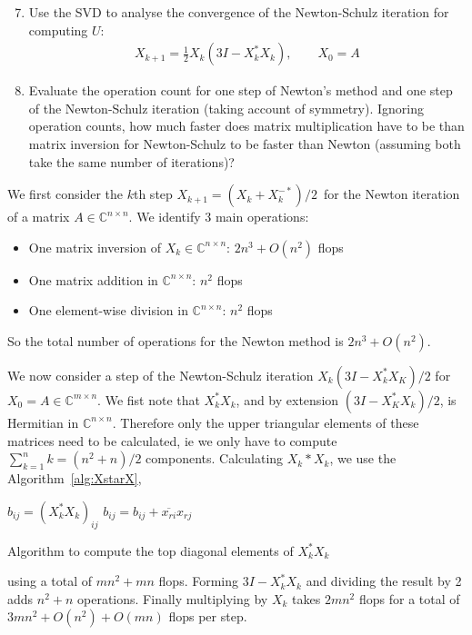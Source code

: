 \documentclass[10pt, A4paper]{article}
\begin{document}
\vspace{0.2cm}
\begin{enumerate}
	\setcounter{enumi}{6}
	\item Use the SVD to analyse the convergence of the
	Newton\nobreakdash-Schulz iteration for computing $U$:
	\begin{align*}
		X_{k+1} = \frac{1}{2}X_k(3I - X_k^* X_k), \qquad X_0 = A
	\end{align*}
\end{enumerate}


\vspace{0.2cm}
\begin{enumerate}
	\setcounter{enumi}{7}
	\item Evaluate the operation count for one step of Newton's 
	method and one step of the Newton\nobreakdash-Schulz iteration (taking
	account of symmetry). Ignoring operation counts, how much faster
	does matrix multiplication have to be than matrix inversion for
	Newton\nobreakdash-Schulz to be faster than Newton (assuming both take the same number of iterations)?
\end{enumerate}

We first consider the $k$th step $X_{k+1} = (X_k + X_k^{-*})/2\,$ for 
the Newton iteration of a matrix $A \in \mathbb{C}^{n\times n}$. We 
identify 3 main operations:
\begin{itemize}
	\item One matrix inversion of $X_k \in \mathbb{C}^{n \times n}$: 
	\hfill
	$2n^3 + O(n^2)$ flops
	
	\item One matrix addition in $\mathbb{C}^{n \times n}$:
	\hfill
	$n^2$ flops
	
	\item One element-wise division in $\mathbb{C}^{n \times n}$:
	\hfill
	$n^2$ flops
\end{itemize}
So the total number of operations for the Newton method is $2n^3 + 
O(n^2)$.

We now consider a step of the Newton-Schulz iteration $X_k(3I - 
X_k^*X_K)/2$ for $X_0 = A \in \mathbb{C}^{m \times n}$.
We fist note that $X_k^*X_k$, and by extension $(3I - X_K^*X_k)/2$, is 
Hermitian in $\mathbb{C}^{n \times n}$.
Therefore only the upper triangular elements of these matrices need to 
be calculated, ie we only have to compute $\sum_{k=1}^{n} k= (n^2+n)/2$ 
components.
Calculating $X_k*X_k$, we use the Algorithm~\ref{alg:XstarX},
\begin{algorithm}
	$b_{ij} = (X_k^*X_k)_{ij}$ \;
	{
		{
				{
					$b_{ij} = b_{ij} + \overline{x_{ri}}x_{rj}$ \;
				}
		}
	}
	\caption{Algorithm to compute the top diagonal elements of 
	$X_k^*X_k$}
	\label{alg:XstarX}
\end{algorithm}
using a total of $mn^2 + mn$ flops. Forming $3I - X_k^*X_k$ and 
dividing the result by 2 adds $n^2 + n$ operations. Finally multiplying 
by $X_k$ takes $2mn^2$ flops for a total of $3mn^2 + O(n^2) + O(mn)$ 
flops per step.





\end{document}
